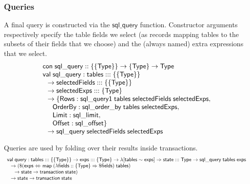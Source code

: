 \documentclass{article}
\newcommand{\mt}[1]{\mathsf{#1}}
\newcommand{\rc}{+ \hspace{-.075in} + \;}
\begin{document}
\subsubsection{Queries}

A final query is constructed via the $\mt{sql\_query}$ function.  Constructor arguments respectively specify the table fields we select (as records mapping tables to the subsets of their fields that we choose) and the (always named) extra expressions that we select.
$$\begin{array}{l}
  \mt{con} \; \mt{sql\_query} :: \{\{\mt{Type}\}\} \to \{\mt{Type}\} \to \mt{Type} \\
  \mt{val} \; \mt{sql\_query} : \mt{tables} ::: \{\{\mt{Type}\}\} \\
  \hspace{.1in} \to \mt{selectedFields} ::: \{\{\mt{Type}\}\} \\
  \hspace{.1in} \to \mt{selectedExps} ::: \{\mt{Type}\} \\
  \hspace{.1in} \to \{\mt{Rows} : \mt{sql\_query1} \; \mt{tables} \; \mt{selectedFields} \; \mt{selectedExps}, \\
  \hspace{.2in} \mt{OrderBy} : \mt{sql\_order\_by} \; \mt{tables} \; \mt{selectedExps}, \\
  \hspace{.2in} \mt{Limit} : \mt{sql\_limit}, \\
  \hspace{.2in} \mt{Offset} : \mt{sql\_offset}\} \\
  \hspace{.1in} \to \mt{sql\_query} \; \mt{selectedFields} \; \mt{selectedExps}
\end{array}$$

Queries are used by folding over their results inside transactions.
$$\begin{array}{l}
  \mt{val} \; \mt{query} : \mt{tables} ::: \{\{\mt{Type}\}\} \to \mt{exps} ::: \{\mt{Type}\} \to \lambda [\mt{tables} \sim \mt{exps}] \Rightarrow \mt{state} ::: \mt{Type} \to \mt{sql\_query} \; \mt{tables} \; \mt{exps} \\
  \hspace{.1in} \to (\$(\mt{exps} \rc \mt{map} \; (\lambda \mt{fields} :: \{\mt{Type}\} \Rightarrow \$\mt{fields}) \; \mt{tables}) \\
  \hspace{.2in} \to \mt{state} \to \mt{transaction} \; \mt{state}) \\
  \hspace{.1in} \to \mt{state} \to \mt{transaction} \; \mt{state}
\end{array}$$
\end{document}
